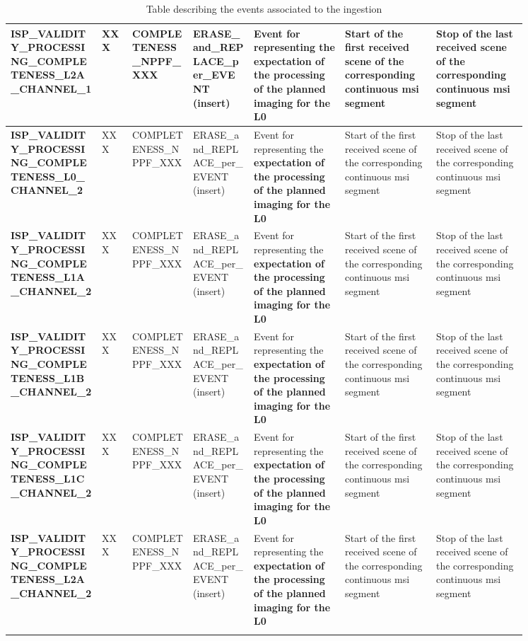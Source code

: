 \begin{landscape}
\begin{longtable}{|M{0.15\linewidth}|M{0.05\linewidth}|M{0.10\linewidth}|M{0.10\linewidth}|M{0.15\linewidth}|M{0.15\linewidth}|M{0.15\linewidth}|}
\textbf{ISP\_VALIDITY\_PROCESSING\_COMPLETENESS\_L2A\_CHANNEL\_1} & XXX & \- COMPLETENESS\_NPPF\_XXX & ERASE\_and\_REPLACE\_per\_EVENT (insert) & Event for representing the \textbf{expectation of the processing of the planned imaging for the L0} & Start of the first received scene of the corresponding continuous \acrshort{msi} segment & Stop of the last received scene of the corresponding continuous \acrshort{msi} segment \\ \hline
\textbf{ISP\_VALIDITY\_PROCESSING\_COMPLETENESS\_L0\_CHANNEL\_2} & XXX & \- COMPLETENESS\_NPPF\_XXX & ERASE\_and\_REPLACE\_per\_EVENT (insert) & Event for representing the \textbf{expectation of the processing of the planned imaging for the L0} & Start of the first received scene of the corresponding continuous \acrshort{msi} segment & Stop of the last received scene of the corresponding continuous \acrshort{msi} segment \\ \hline
\textbf{ISP\_VALIDITY\_PROCESSING\_COMPLETENESS\_L1A\_CHANNEL\_2} & XXX & \- COMPLETENESS\_NPPF\_XXX & ERASE\_and\_REPLACE\_per\_EVENT (insert) & Event for representing the \textbf{expectation of the processing of the planned imaging for the L0} & Start of the first received scene of the corresponding continuous \acrshort{msi} segment & Stop of the last received scene of the corresponding continuous \acrshort{msi} segment \\ \hline
\textbf{ISP\_VALIDITY\_PROCESSING\_COMPLETENESS\_L1B\_CHANNEL\_2} & XXX & \- COMPLETENESS\_NPPF\_XXX & ERASE\_and\_REPLACE\_per\_EVENT (insert) & Event for representing the \textbf{expectation of the processing of the planned imaging for the L0} & Start of the first received scene of the corresponding continuous \acrshort{msi} segment & Stop of the last received scene of the corresponding continuous \acrshort{msi} segment \\ \hline
\textbf{ISP\_VALIDITY\_PROCESSING\_COMPLETENESS\_L1C\_CHANNEL\_2} & XXX & \- COMPLETENESS\_NPPF\_XXX & ERASE\_and\_REPLACE\_per\_EVENT (insert) & Event for representing the \textbf{expectation of the processing of the planned imaging for the L0} & Start of the first received scene of the corresponding continuous \acrshort{msi} segment & Stop of the last received scene of the corresponding continuous \acrshort{msi} segment \\ \hline
\textbf{ISP\_VALIDITY\_PROCESSING\_COMPLETENESS\_L2A\_CHANNEL\_2} & XXX & \- COMPLETENESS\_NPPF\_XXX & ERASE\_and\_REPLACE\_per\_EVENT (insert) & Event for representing the \textbf{expectation of the processing of the planned imaging for the L0} & Start of the first received scene of the corresponding continuous \acrshort{msi} segment & Stop of the last received scene of the corresponding continuous \acrshort{msi} segment \\ \hline
\caption{Table describing the events associated to the ingestion}
\label{tb:description_events_ingestion_eisp}
\end{longtable}
\end{landscape}
